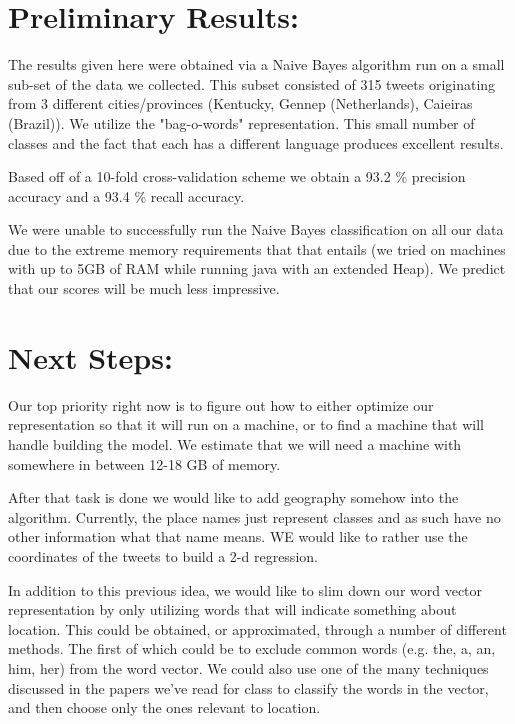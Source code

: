 \documentclass[12pt]{article}
\begin{document}
\section*{Preliminary Results:}
The results given here were obtained via a Naive Bayes algorithm run on a small sub-set of the data we collected. This subset consisted of 315 tweets originating from 3 different cities/provinces (Kentucky, Gennep (Netherlands), Caieiras (Brazil)). We utilize the "bag-o-words" representation. This small number of classes and the fact that each has a different language produces excellent results. 

Based off of a 10-fold cross-validation scheme we obtain a 93.2 \% precision accuracy and a 93.4 \% recall accuracy. 

We were unable to successfully run the Naive Bayes classification on all our data due to the extreme memory requirements that that entails (we tried on machines with up to 5GB of RAM while running java with an extended Heap). We predict that our scores will be much less impressive. 

\section*{Next Steps:}
Our top priority right now is to figure out how to either optimize our representation so that it will run on a machine, or to find a machine that will handle building the model. We estimate that we will need a machine with somewhere in between 12-18 GB of memory. 

After that task is done we would like to add geography somehow into the algorithm. Currently, the place names just represent classes and as such have no other information what that name means. WE would like to rather use the coordinates of the tweets to build a 2-d regression. 

In addition to this previous idea, we would like to slim down our word vector representation by only utilizing words that will indicate something about location. This could be obtained, or approximated,  through a number of different methods. The first of which could be to exclude common words (e.g. the, a, an, him, her) from the word vector. We could also use one of the many techniques discussed in the papers we've read for class to classify the words in the vector, and then choose only the ones relevant to location. 
\end{document}
